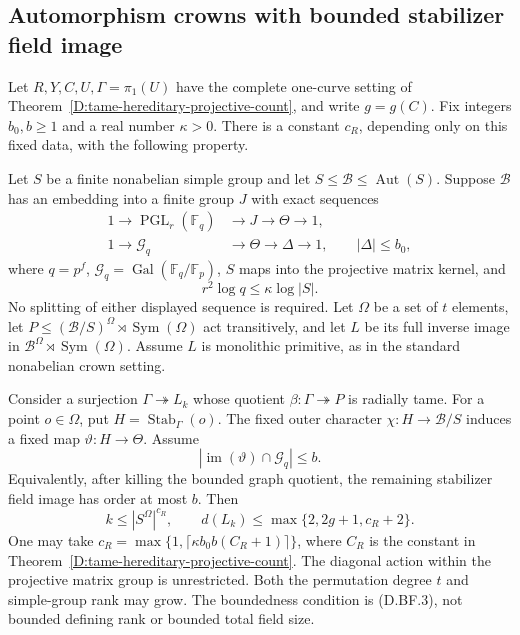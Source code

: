\subsection{Automorphism crowns with bounded stabilizer field image}

\begin{corollary}
\label{D:bounded-field-automorphism-crowns}
Let $R,Y,C,U,\Gamma=\pi_1(U)$ have the complete one-curve
setting of Theorem~\ref{D:tame-hereditary-projective-count},
and write $g=g(C)$. Fix integers $b_0,b\geq1$ and a real
number $\kappa>0$. There is a constant $c_R$, depending
only on this fixed data, with the following property.

Let $S$ be a finite nonabelian simple group and let
$S\leq\mathcal B\leq\operatorname{Aut}(S)$. Suppose
$\mathcal B$ has an embedding into a finite group $J$
with exact sequences
\[
 \begin{split}
 1\longrightarrow\operatorname{PGL}_r(\mathbb F_q)
   &\longrightarrow J\longrightarrow\Theta\longrightarrow1,\\
 1\longrightarrow\mathcal G_q
   &\longrightarrow\Theta\longrightarrow\Delta\longrightarrow1,
                \qquad |\Delta|\leq b_0,
 \end{split}                                                   \tag{D.BF.1}
\]
where $q=p^f$, $\mathcal G_q=\operatorname{Gal}(\mathbb F_q/\mathbb F_p)$,
$S$ maps into the projective matrix kernel, and
\[
                       r^2\log q\leq\kappa\log|S|.             \tag{D.BF.2}
\]
No splitting of either displayed sequence is required.
Let $\Omega$ be a set of $t$ elements, let
$P\leq(\mathcal B/S)^\Omega\rtimes\operatorname{Sym}(\Omega)$
act transitively, and let $L$ be its full inverse image
in $\mathcal B^\Omega\rtimes\operatorname{Sym}(\Omega)$.
Assume $L$ is monolithic primitive, as in the standard
nonabelian crown setting.

Consider a surjection $\Gamma\twoheadrightarrow L_k$ whose
quotient $\beta:\Gamma\twoheadrightarrow P$ is radially
tame. For a point $o\in\Omega$, put
$H=\operatorname{Stab}_\Gamma(o)$. The fixed outer character
$\chi:H\to\mathcal B/S$ induces a fixed map
$\vartheta:H\to\Theta$. Assume
\[
          |\operatorname{im}(\vartheta)\cap\mathcal G_q|
                                                       \leq b. \tag{D.BF.3}
\]
Equivalently, after killing the bounded graph quotient,
the remaining stabilizer field image has order at most $b$.
Then
\[
 k\leq |S^\Omega|^{c_R},\qquad
 d(L_k)\leq\max\{2,2g+1,c_R+2\}.                            \tag{D.BF.4}
\]
One may take
$c_R=\max\{1,\lceil\kappa b_0b(C_R+1)\rceil\}$, where
$C_R$ is the constant in
Theorem~\ref{D:tame-hereditary-projective-count}.
The diagonal action within the projective matrix group
is unrestricted. Both the permutation degree $t$ and
simple-group rank may grow. The boundedness condition
is (D.BF.3), not bounded defining rank or bounded total
field size.
\end{corollary}

